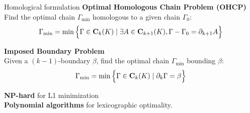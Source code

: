 \begin{frame}[t]{Homological formulation}
\small
\textbf{Optimal Homologous Chain Problem (OHCP)} \\

Find the optimal chain $\Gamma_{\min}$ homologous to a given chain $\Gamma_0$:
\begin{equation*}
	\Gamma_{\min} = \min \Big\{ \Gamma \in \mathbf{C}_k(K) \mid \exists A \in \mathbf{C}_{k+1}(K), \Gamma - \Gamma_0 = \partial_{k+1} A \Big\}
\end{equation*}

\vspace{0.5cm}

\textbf{Imposed Boundary Problem} \\

Given a $(k-1)$-boundary $\beta$, find the optimal chain $\Gamma_{\min}$ bounding $\beta$:
\begin{equation*}
	\Gamma_{\min} = \min \Big\{ \Gamma \in \mathbf{C}_k(K) \mid \partial_k \Gamma = \beta \Big\}
\end{equation*}

\pause
\vspace{0.5cm}
\textbf{NP-hard} for L1 minimization \cite{dey_ComputingMinimalPersistent_2020} \\
\pause
\textbf{Polynomial algorithms} for lexicographic optimality.
\end{frame}

%	
%	
%	
%	

